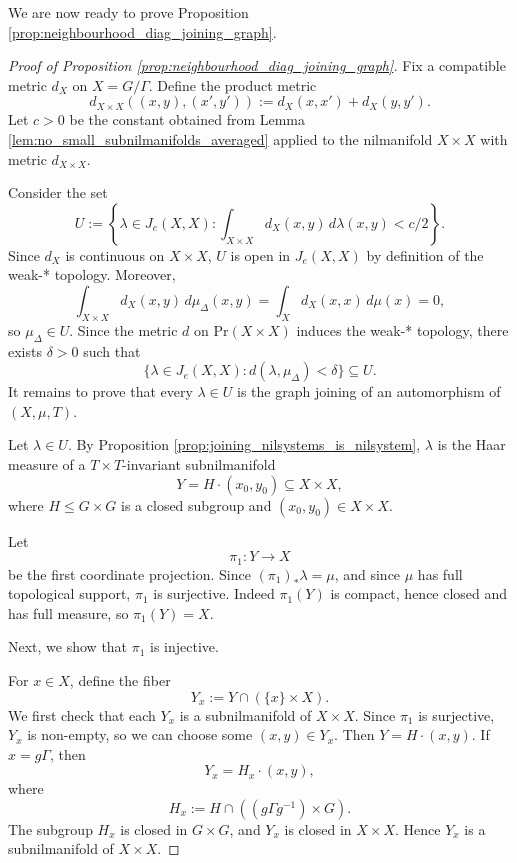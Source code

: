 \documentclass[12pt]{amsart}
\theoremstyle{plain}
\theoremstyle{definition}
\begin{document}
We are now ready to prove Proposition \ref{prop:neighbourhood_diag_joining_graph}. 

\begin{proof}[Proof of Proposition \ref{prop:neighbourhood_diag_joining_graph}]
    Fix a compatible metric $d_X$ on $X = G/\Gamma$.
    Define the product metric 
    \[
    d_{X \times X}((x,y), (x',y')) := d_X(x,x') + d_X (y,y').
    \]
    Let $c > 0$ be the constant obtained from Lemma \ref{lem:no_small_subnilmanifolds_averaged} applied to the nilmanifold $X \times X$ with metric $d_{X \times X}$.

    Consider the set 
    \[
    U := \left\{ \lambda \in J_e(X, X) : \int_{X \times X} d_X(x,y) \,d\lambda(x,y) < c/2 \right\}.
    \]
    Since $d_X$ is continuous on $X \times X$, $U$ is open in $J_e(X,X)$ by definition of the weak-* topology.
    Moreover, 
    \[
    \int_{X \times X} d_X(x,y) \,d\mu_\Delta(x,y)
    = \int_{X} d_X(x,x) \,d\mu(x) = 0,
    \]
    so $\mu_\Delta \in U$. 
    Since the metric $d$ on $\mathrm{Pr}(X \times X)$ induces the weak-* topology, there exists $\delta > 0$ such that 
    \[
    \{\lambda \in J_e(X,X) : d(\lambda, \mu_\Delta) < \delta\} \subseteq U.
    \]
    It remains to prove that every $\lambda \in U$ is the graph joining of an automorphism of $(X, \mu, T)$. 

    Let $\lambda \in U$.
    By Proposition \ref{prop:joining_nilsystems_is_nilsystem}, $\lambda$ is the Haar measure of a $T \times T$-invariant subnilmanifold 
    \[
    Y = H \cdot (x_0, y_0) \subseteq X \times X,
    \]
    where $H \leq G \times G$ is a closed subgroup and $(x_0, y_0) \in X \times X$. 

    Let 
    \[
    \pi_1 \colon Y \to X
    \]
    be the first coordinate projection. 
    Since $(\pi_1)_* \lambda = \mu$, and since $\mu$ has full topological support, $\pi_1$ is surjective.
    Indeed $\pi_1(Y)$ is compact, hence closed and has full measure, so $\pi_1(Y) = X$.
    
    Next, we show that $\pi_1$ is injective.

    For $x \in X$, define the fiber
    \[
    Y_x := Y \cap (\{x\} \times X).
    \]
    We first check that each $Y_x$ is a subnilmanifold of $X \times X$.
    Since $\pi_1$ is surjective, $Y_x$ is non-empty, so we can choose some $(x,y) \in Y_x$.
    Then $Y = H \cdot (x,y)$.
    If $x = g\Gamma$, then 
    \[
    Y_x = H_x \cdot (x,y),
    \]
    where 
    \[
    H_x := H \cap ((g \Gamma g^{-1}) \times G).
    \]
    The subgroup $H_x$ is closed in $G \times G$, and $Y_x$ is closed in $X \times X$. 
    Hence $Y_x$ is a subnilmanifold of $X \times X$.


\end{proof}
\end{document}
